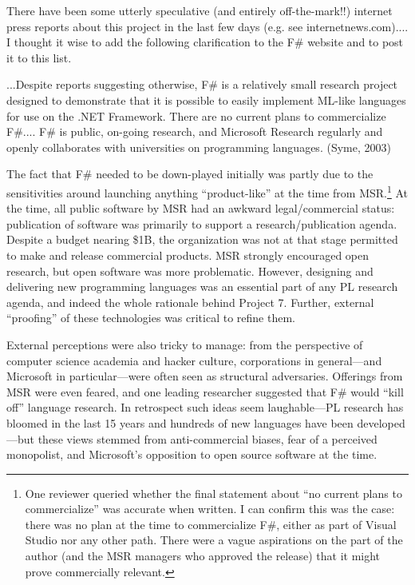 \documentclass[acmsmall]{acmart}\settopmatter{}
\begin{document}
\begin{verbquote}
There have been some utterly speculative (and entirely off-the-mark!!) internet press reports about this project in the last few days (e.g. see internetnews.com).... I thought it wise to add the following clarification to the F# website and to post it to this list.

...Despite reports suggesting otherwise, F# is a relatively small research project designed to demonstrate that it is possible to easily implement ML-like languages for use on the .NET Framework.  There are no current plans to commercialize F#.... F# is public, on-going research, and Microsoft Research regularly and openly collaborates with universities on programming languages. (Syme, 2003)  
\end{verbquote}

The fact that F\# needed to be down-played initially was partly due to the sensitivities around launching anything “product-like” at the time from MSR.\footnote{One reviewer queried whether the final statement about ``no current plans to commercialize'' was accurate when written.  I can confirm this was the case: there was no plan at the time to commercialize F\#, either as part of Visual Studio nor any other path. There were a vague aspirations on the part of the author (and the MSR managers who approved the release) that it might prove commercially relevant.} At the time, all public software by MSR had an awkward legal/commercial status: publication of software was primarily to support a research/publication agenda. Despite a budget nearing \$1B, the organization was not at that stage permitted to make and release commercial products.  MSR strongly encouraged open research, but open software was more problematic. However, designing and delivering new programming languages was an essential part of any PL research agenda, and indeed the whole rationale behind Project 7.  Further, external “proofing” of these technologies was critical to refine them. 

External perceptions were also tricky to manage: from the perspective of computer science academia and hacker culture, corporations in general---and Microsoft in particular---were often seen as structural adversaries. Offerings from MSR were even feared, and one leading researcher suggested that F\# would “kill off” language research.  In retrospect such ideas seem laughable---PL research has bloomed in the last 15 years and hundreds of new languages have been developed---but these views stemmed from anti-commercial biases, fear of a perceived monopolist, and Microsoft’s opposition to open source software at the time. 
\end{document}
